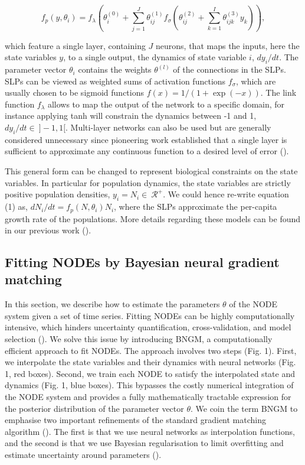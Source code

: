 \documentclass[11pt, oneside]{article}
\begin{document}
\vspace{-0.5cm}
\begin{equation}
    f_p \left(y, \theta_i \right) = f_\lambda \left( \theta_i^{(0)} + \sum_{j=1}^{J} \theta^{(1)}_{ij} f_\sigma \left( \theta^{(2)}_{ij} + \sum_{k=1}^{I} \theta^{(3)}_{ijk} y_k \right) \right),
\end{equation}

which feature a single layer, containing $J$ neurons, that maps the inputs, here the state variables $y$, to a single output, the dynamics of state variable $i$, $dy_i/dt$.
The parameter vector $\theta_i$ contains the weights $\theta^{(l)}$ of the connections in the SLPs.
SLPs can be viewed as weighted sums of activation functions $f_\sigma$, which are usually chosen to be sigmoid functions $f(x) = 1/(1+\exp(-x))$.
The link function $f_\lambda$ allows to map the output of the network to a specific domain, for instance applying tanh will constrain the dynamics between -1 and 1, $dy_i/dt \in~]-1,1[$. 
Multi-layer networks can also be used but are generally considered unnecessary since pioneering work established that a single layer is sufficient to approximate any continuous function to a desired level of error (\cite{Funahashi1993}).

This general form can be changed to represent biological constraints on the state variables.
In particular for population dynamics, the state variables are strictly positive population densities, $y_i = N_i \in~\mathcal{R^+}$.
We could hence re-write equation (1) as, $dN_i/dt = f_p(N,\theta_i)N_i$, where the SLPs approximate the per-capita growth rate of the populations.
More details regarding these models can be found in our previous work (\cite{Bonnaffe2021a}).

\subsection{Fitting NODEs by Bayesian neural gradient matching}

In this section, we describe how to estimate the parameters $\theta$ of the NODE system given a set of time series. 
Fitting NODEs can be highly computationally intensive, which hinders uncertainty quantification, cross-validation, and model selection (\cite{Bonnaffe2021a}).
We solve this issue by introducing BNGM, a computationally efficient approach to fit NODEs.
The approach involves two steps (Fig. 1).
First, we interpolate the state variables and their dynamics with neural networks (Fig. 1, red boxes).
Second, we train each NODE to satisfy the interpolated state and dynamics (Fig. 1, blue boxes).
This bypasses the costly numerical integration of the NODE system and provides a fully mathematically tractable expression for the posterior distribution of the parameter vector $\theta$. 
We coin the term BNGM to emphasise two important refinements of the standard gradient matching algorithm (\cite{Ellner2002}). 
The first is that we use neural networks as interpolation functions, and the second is that we use Bayesian regularisation to limit overfitting and estimate uncertainty around parameters (\cite{Cawley2007}).
\end{document}
